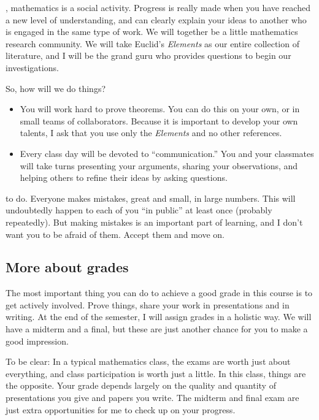 \documentclass{tufte-handout}
\theoremstyle{definition}
\begin{document}
, mathematics is a social activity.
Progress is really made when you have reached a new level of understanding, and can clearly explain your ideas to another who is engaged in the same type of work.
We will together be a little mathematics research community.
We will take Euclid's \emph{Elements} as our entire collection of literature, and I will be the grand guru who provides questions to begin our investigations.

So, how will we do things?
\begin{itemize}
\item You will work hard to prove theorems.
You can do this on your own, or in small teams of collaborators.
Because it is important to develop your own talents, I ask that you use only the \emph{Elements} and no other references.

\item Every class day will be devoted to ``communication.''
You and your classmates will take turns presenting your arguments, sharing your observations, and helping others to refine their ideas by asking questions.
\end{itemize}



 to do.
Everyone makes mistakes, great and small, in large numbers.
This will undoubtedly happen to each of you ``in public'' at least once (probably repeatedly).
But making mistakes is an important part of learning, and I don't want you to be afraid of them.
Accept them and move on.

\subsection*{More about grades}
The most important thing you can do to achieve a good grade in this course is to get actively involved.
Prove things, share your work in presentations and in writing.
At the end of the semester, I will assign grades in a holistic way.
We will have a midterm and a final, but these are just another chance for you to make a good impression.

To be clear: In a typical mathematics class, the exams are worth just about everything, and class participation is worth just a little.
In this class, things are the opposite.
Your grade depends largely on the quality and quantity of presentations you give and papers you write.
The midterm and final exam are just extra opportunities for me to check up on your progress.
\end{document}
